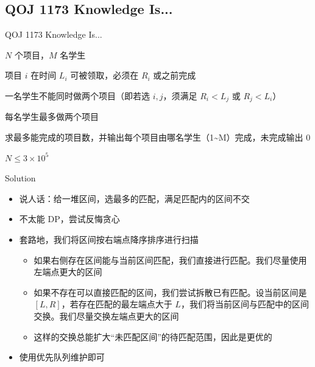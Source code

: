 ﻿\documentclass[aspectratio=169,handout]{ctexbeamer}
\begin{document}
\subsection{QOJ 1173 Knowledge Is...}
\begin{frame}{QOJ 1173 Knowledge Is...}

$N$ 个项目，$M$ 名学生

项目 $i$ 在时间 $L_i$ 可被领取，必须在 $R_i$ 或之前完成

一名学生不能同时做两个项目（即若选 $i,j$，须满足 $R_i<L_j$ 或 $R_j<L_i$）

每名学生最多做两个项目

求最多能完成的项目数，并输出每个项目由哪名学生（1\textasciitilde M）完成，未完成输出 0

$N\leq 3\times 10^5$
\end{frame}

\begin{frame}{Solution}
    \begin{itemize}
        \item 说人话：给一堆区间，选最多的匹配，满足匹配内的区间不交
        \pause
        \item 不太能 DP，尝试反悔贪心
        \item 套路地，我们将区间按右端点降序排序进行扫描
        \pause
        \begin{itemize}
            \item 如果右侧存在区间能与当前区间匹配，我们直接进行匹配。我们尽量使用左端点更大的区间
            \pause
            \item 如果不存在可以直接匹配的区间，我们尝试拆散已有匹配。设当前区间是 $[L,R]$，若存在匹配的最左端点大于 $L$，我们将当前区间与匹配中的区间交换。我们尽量交换左端点更大的区间
            \pause
            \item 这样的交换总能扩大“未匹配区间”的待匹配范围，因此是更优的
        \end{itemize}
        \item 使用优先队列维护即可
    \end{itemize}
\end{frame}
\end{document}
